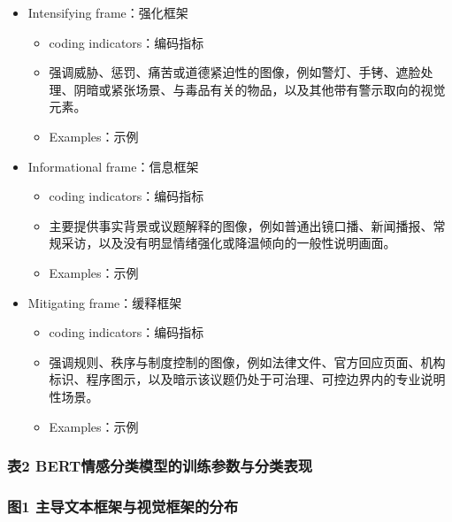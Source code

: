 \documentclass[
]{article}
\providecommand{\tightlist}{%
  \setlength{\itemsep}{0pt}\setlength{\parskip}{0pt}}
\begin{document}
\begin{itemize}
\tightlist
\item
  Intensifying frame：强化框架

  \begin{itemize}
  \tightlist
  \item
    coding indicators：编码指标
  \item
    强调威胁、惩罚、痛苦或道德紧迫性的图像，例如警灯、手铐、遮脸处理、阴暗或紧张场景、与毒品有关的物品，以及其他带有警示取向的视觉元素。
  \item
    Examples：示例
  \end{itemize}
\item
  Informational frame：信息框架

  \begin{itemize}
  \tightlist
  \item
    coding indicators：编码指标
  \item
    主要提供事实背景或议题解释的图像，例如普通出镜口播、新闻播报、常规采访，以及没有明显情绪强化或降温倾向的一般性说明画面。
  \item
    Examples：示例
  \end{itemize}
\item
  Mitigating frame：缓释框架

  \begin{itemize}
  \tightlist
  \item
    coding indicators：编码指标
  \item
    强调规则、秩序与制度控制的图像，例如法律文件、官方回应页面、机构标识、程序图示，以及暗示该议题仍处于可治理、可控边界内的专业说明性场景。
  \item
    Examples：示例
  \end{itemize}
\end{itemize}

\subsubsection{表2
BERT情感分类模型的训练参数与分类表现}\label{ux88682-bertux60c5ux611fux5206ux7c7bux6a21ux578bux7684ux8badux7ec3ux53c2ux6570ux4e0eux5206ux7c7bux8868ux73b0}

\subsubsection{图1
主导文本框架与视觉框架的分布}\label{ux56fe1-ux4e3bux5bfcux6587ux672cux6846ux67b6ux4e0eux89c6ux89c9ux6846ux67b6ux7684ux5206ux5e03}
\end{document}
